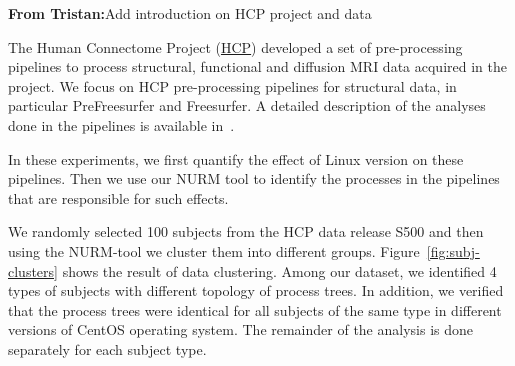 \documentclass[a4paper,num-refs]{oup-contemporary}
\newcommand{\tristan}[1]{\color{blue}\textbf{From Tristan:}#1\color{black}}
\begin{document}
\tristan{Add introduction on HCP project and data}

The Human Connectome Project (\href{https://www.humanconnectome.org}{HCP})
developed a set of pre-processing pipelines to process structural,
functional and diffusion MRI data acquired in the project. We focus on HCP
pre-processing pipelines for structural data, in particular PreFreesurfer
and Freesurfer. A detailed description of the analyses done in the
pipelines is available in~\cite{glasser2013minimal}.

In these experiments, we first quantify the effect of Linux version on
these pipelines. Then we use our NURM tool to identify the processes in the
pipelines that are responsible for such effects.

We randomly selected 100 subjects from the HCP data release S500 and then 
using the NURM-tool we cluster them into different groups. 
Figure~\ref{fig:subj-clusters} shows the result of data clustering. 
Among our dataset, we identified 4 types of subjects with 
different topology of process trees. In addition, we verified that 
the process trees were identical for all subjects of the same type in 
different versions of CentOS operating system. The remainder of the 
analysis is done separately for each subject type.

\end{document}
